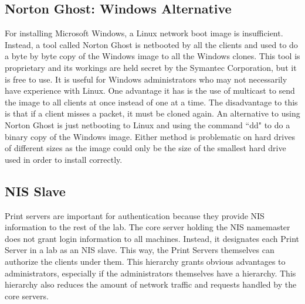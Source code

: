 \subsection{Norton Ghost:  Windows Alternative}
For installing Microsoft Windows, a Linux network boot image is insufficient.  Instead, a tool called Norton Ghost is netbooted by all the clients and used to do a byte by byte copy of the Windows image to all the Windows clones.  This tool is proprietary and its workings are held secret by the Symantec Corporation, but it is free to use.  It is useful for Windows administrators who may not necessarily have experience with Linux.  One advantage it has is the use of multicast to send the image to all clients at once instead of one at a time.  The disadvantage to this is that if a client misses a packet, it must be cloned again.  An alternative to using Norton Ghost is just netbooting to Linux and using the command ``dd" to do a binary copy of the Windows image.  Either method is problematic on hard drives of different sizes as the image could only be the size of the smallest hard drive used in order to install correctly.  

\subsection{NIS Slave}
Print servers are important for authentication because they provide NIS information to the rest of the lab.  The core server holding the NIS namemaster does not grant login information to all machines.  Instead, it designates each Print Server in a lab as an NIS slave.  This way, the Print Servers themselves can authorize the clients under them.  This hierarchy grants obvious advantages to administrators, especially if the administrators themselves have a hierarchy. This hierarchy also reduces the amount of network traffic and requests handled by the core servers.  
